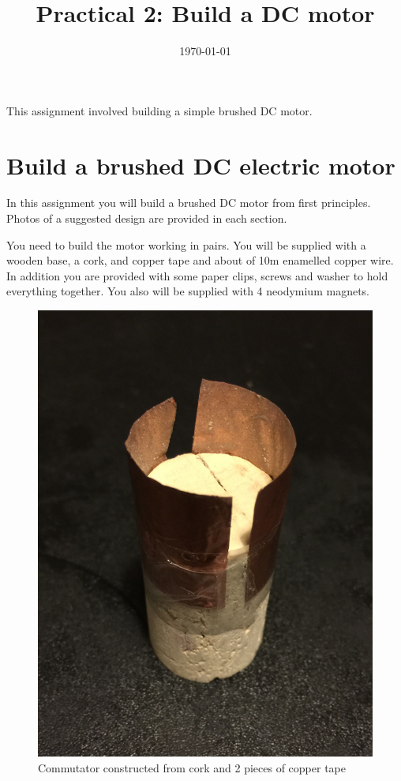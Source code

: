 \documentclass{instructions}
\title{Practical 2: Build a DC motor}
\date{\today}
\begin{document}
\maketitle




This assignment involved building a simple brushed DC motor.

\part{Build a brushed DC electric motor}

In this assignment you will build a brushed DC motor from first
principles. Photos of a suggested design are provided in each section.

You need to build the motor working in pairs. You will be supplied with
a wooden base, a cork, and copper tape and about of 10m enamelled copper
wire. In addition you are provided with some paper clips, screws and
washer to hold everything together. You also will be supplied with 4
neodymium magnets.



\begin{figure}
    \centering
    \includegraphics[width=0.5\linewidth]{dc-motor-000}
    \caption{Commutator constructed from cork and 2 pieces of copper tape}
    \label{fig1}
\end{figure}
\end{document}
